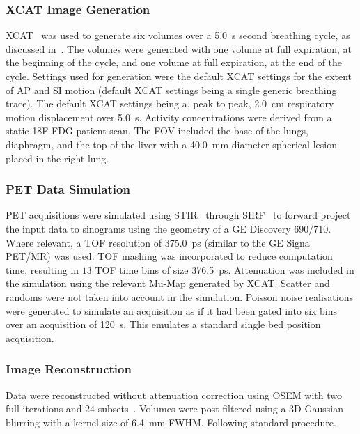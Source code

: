             \subsubsection{XCAT Image Generation} \label{sec:impact_of_tof_on_respiratory_motion_model_estimation_using_pre_gated_no_intra_cycle_motion_nac_pet_methods_xcat_image_generation}
                \gls{XCAT}~\parencite{Segars2010} was used to generate six volumes over a \SI{5.0}{\second} second breathing cycle, as discussed in~. The volumes were generated with one volume at full expiration, at the beginning of the cycle, and one volume at full expiration, at the end of the cycle. Settings used for generation were the default \gls{XCAT} settings for the extent of \gls{AP} and \gls{SI} motion (default \gls{XCAT} settings being a single generic breathing trace). The default \gls{XCAT} settings being a, peak to peak, \SI{2.0}{\centi\metre} respiratory motion displacement over \SI{5.0}{\second}. Activity concentrations were derived from a static \gls{18F-FDG} patient scan. The \gls{FOV} included the base of the lungs, diaphragm, and the top of the liver with a \SI{40.0}{\milli\metre} diameter spherical lesion placed in the right lung.
            
            \subsubsection{PET Data Simulation} \label{sec:impact_of_tof_on_respiratory_motion_model_estimation_using_pre_gated_no_intra_cycle_motion_nac_pet_methods_pet_data_simulation}
                \gls{PET} acquisitions were simulated using \gls{STIR}~\parencite{Thielemans2012} through \gls{SIRF}~\parencite{Ovtchinnikov2017} to forward project the input data to sinograms using the geometry of a \gls{GE} Discovery 690/710. Where relevant, a \gls{TOF} resolution of \SI{375.0}{\pico\second} (similar to the \gls{GE} Signa \gls{PET}/\gls{MR}) was used. \gls{TOF} mashing was incorporated to reduce computation time, resulting in $13$ \gls{TOF} time bins of size \SI{376.5}{\pico\second}. Attenuation was included in the simulation using the relevant \gls{Mu-Map} generated by \gls{XCAT}. Scatter and randoms were not taken into account in the simulation. Poisson noise realisations were generated to simulate an acquisition as if it had been gated into six bins over an acquisition of \SI{120}{\second}. This emulates a standard single bed position acquisition. 
            
            \subsubsection{Image Reconstruction} \label{sec:impact_of_tof_on_respiratory_motion_model_estimation_using_pre_gated_no_intra_cycle_motion_nac_pet_methods_image_reconstruction}
                Data were reconstructed without attenuation correction using \gls{OSEM} with two full iterations and $24$ subsets~\parencite{Hudson1994}. Volumes were post-filtered using a \gls{3D} Gaussian blurring with a kernel size of \SI{6.4}{\milli\metre} \gls{FWHM}. Following standard procedure.
            
